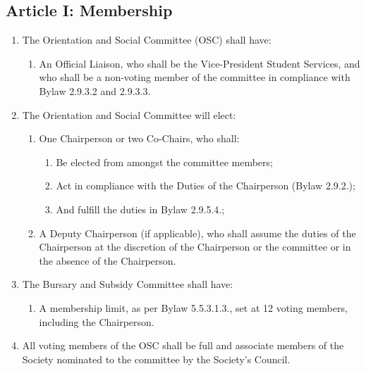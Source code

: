 \subsection{Article I: Membership}
\begin{enumerate}[label*=\arabic*., align=left]	
\item The Orientation and Social Committee (OSC) shall have:
\begin{enumerate}[label*=\arabic*., align=left]	
\item An Official Liaison, who shall be the Vice-President Student Services, and who shall be a non-voting member of the committee in compliance with Bylaw 2.9.3.2 and 2.9.3.3.
\end{enumerate}
\item The Orientation and Social Committee will elect:
\begin{enumerate}[label*=\arabic*., align=left]
\item One Chairperson or two Co-Chairs, who shall:
\begin{enumerate}[label*=\arabic*., align=left]
\item Be elected from amongst the committee members;
\item Act in compliance with the Duties of the Chairperson (Bylaw 2.9.2.);
\item And fulfill the duties in Bylaw 2.9.5.4.;
\end{enumerate}
\item A Deputy Chairperson (if applicable), who shall assume the duties of the Chairperson at the discretion of the Chairperson or the committee or in the absence of the Chairperson.
\end{enumerate}
\item The Bursary and Subsidy Committee shall have:
\begin{enumerate}[label*=\arabic*., align=left]
\item A membership limit, as per Bylaw 5.5.3.1.3., set at 12 voting members, including the Chairperson.
\end{enumerate}
\item All voting members of the OSC shall be full and associate members of the Society nominated to the committee by the Society’s Council.     
\end{enumerate}


